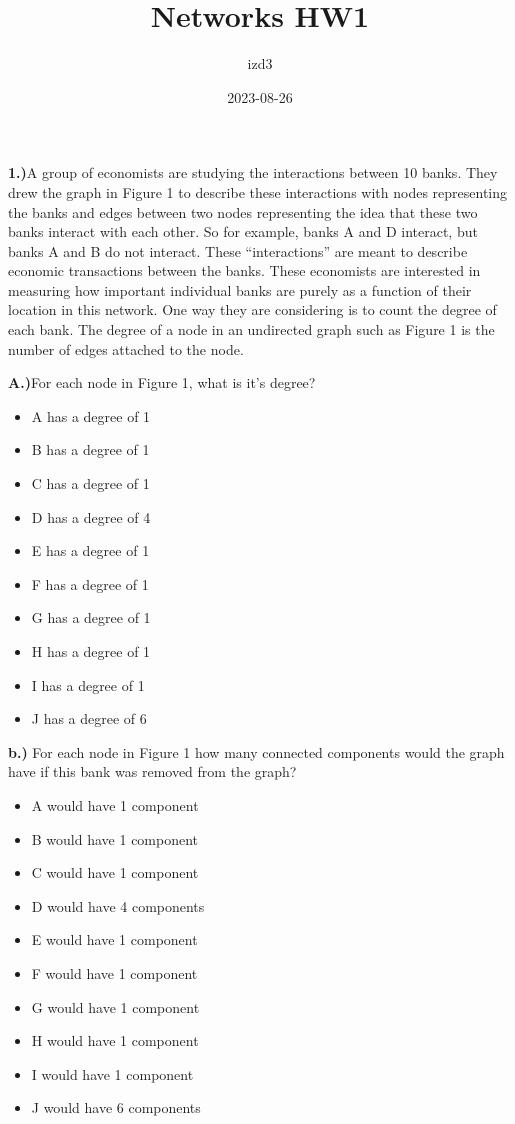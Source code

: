 \documentclass[
]{article}
\title{Networks HW1}
\author{izd3}
\date{2023-08-26}
\begin{document}
\maketitle

\textbf{1.)}A group of economists are studying the interactions between
10 banks. They drew the graph in Figure 1 to describe these interactions
with nodes representing the banks and edges between two nodes
representing the idea that these two banks interact with each other. So
for example, banks A and D interact, but banks A and B do not interact.
These ``interactions'' are meant to describe economic transactions
between the banks. These economists are interested in measuring how
important individual banks are purely as a function of their location in
this network. One way they are considering is to count the degree of
each bank. The degree of a node in an undirected graph such as Figure 1
is the number of edges attached to the node.

\textbf{A.)}For each node in Figure 1, what is it's degree?

\begin{itemize}
\item
  A has a degree of 1
\item
  B has a degree of 1
\item
  C has a degree of 1
\item
  D has a degree of 4
\item
  E has a degree of 1
\item
  F has a degree of 1
\item
  G has a degree of 1
\item
  H has a degree of 1
\item
  I has a degree of 1
\item
  J has a degree of 6
\end{itemize}

\textbf{b.)} For each node in Figure 1 how many connected components
would the graph have if this bank was removed from the graph?

\begin{itemize}
\item
  A would have 1 component
\item
  B would have 1 component
\item
  C would have 1 component
\item
  D would have 4 components
\item
  E would have 1 component
\item
  F would have 1 component
\item
  G would have 1 component
\item
  H would have 1 component
\item
  I would have 1 component
\item
  J would have 6 components
\end{itemize}
\end{document}
